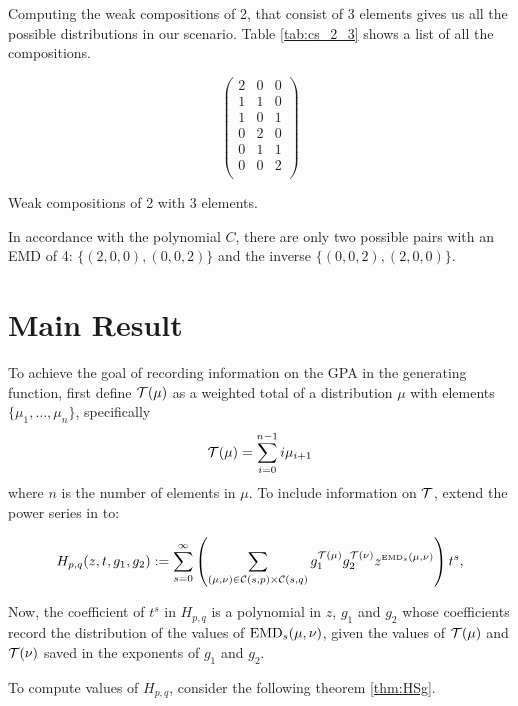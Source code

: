 \documentclass[12pt,letterpaper,oneside,openany]{book}
\begin{document}
Computing the weak compositions of 2, that consist of 3 elements gives us all the possible distributions in our scenario. Table \ref{tab:cs_2_3} shows a list of all the compositions.

\begin{table}
	\centering
	
	$$\begin{pmatrix}
	2 & 0 & 0 \\
	1 & 1 & 0 \\
	1 & 0 & 1 \\
	0 & 2 & 0 \\
	0 & 1 & 1 \\
	0 & 0 & 2 \\
	\end{pmatrix}$$
	
	
	\caption{Weak compositions of 2 with 3 elements.}
	\label{tab:cs_2_3}
\end{table}



In accordance with the polynomial $C$, there are only two possible pairs with an EMD of 4: $\{(2, 0, 0), (0, 0, 2)\}$ and the inverse  $\{(0,0,2),(2,0,0)\}$.

\setcounter{section}{0}
\setcounter{chapter}{3}
\chapter{Main Result}
To achieve the goal of recording information on the GPA in the generating function, first define ${\mathcal{T}}(\mu)$  as a weighted total of a distribution $\mu$ with elements $\{\mu_1, …, \mu_n\}$, specifically
$${\mathcal{T}}(\mu) = \sum_{i=0}^{n-1}i\mu_{i+1}$$
where $n$ is the number of elements in $\mu$. 
To include information on ${\mathcal{T}}$, extend the power series in \cite{bourn2019expected} to:

\[
H_{p,q}(z,t, g_1, g_2) := \sum_{s=0}^\infty \left( \sum_{(\mu,\nu) \in {\mathcal{C}}(s,p) \times {\mathcal{C}}(s,q)}
g_1^{{\mathcal{T}}(\mu)}g_2^{{\mathcal{T}}(\nu)}z^{\tiny {\mbox{EMD}_s}(\mu,\nu)} \right) t^s,
\] 

Now, the coefficient of $t^s$ in $H_{p,q}$ is a polynomial in $z$, $g_1$ and $g_2$ whose coefficients record the distribution of  the values of ${\mbox{EMD}_s}(\mu, \nu)$, given the values of ${\mathcal{T}}(\mu)$ and ${\mathcal{T}}(\nu)$ saved in the exponents of $g_1$ and $g_2$.

To compute values of $H_{p,q}$, consider the following theorem \ref{thm:HSg}.
\end{document}
